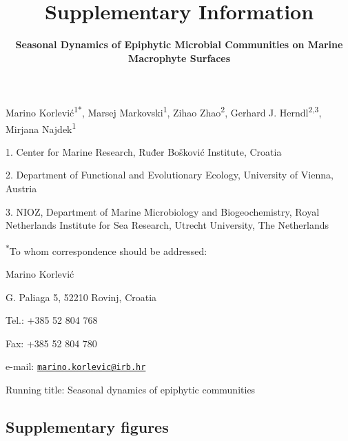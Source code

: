 \documentclass[12pt,]{article}
\title{\textbf{Supplementary Information}}
\subtitle{\textbf{Seasonal Dynamics of Epiphytic Microbial Communities on Marine
Macrophyte Surfaces}}
\author{}
\date{}
\begin{document}
\maketitle

\vspace{20mm}

Marino Korlević\textsuperscript{1\(*\)}, Marsej
Markovski\textsuperscript{1}, Zihao Zhao\textsuperscript{2}, Gerhard J.
Herndl\textsuperscript{2,3}, Mirjana Najdek\textsuperscript{1}

1. Center for Marine Research, Ruđer Bošković Institute, Croatia

2. Department of Functional and Evolutionary Ecology, University of
Vienna, Austria

3. NIOZ, Department of Marine Microbiology and Biogeochemistry, Royal
Netherlands Institute for Sea Research, Utrecht University, The
Netherlands

\textsuperscript{\(*\)}To whom correspondence should be addressed:

Marino Korlević

G. Paliaga 5, 52210 Rovinj, Croatia

Tel.: +385 52 804 768

Fax: +385 52 804 780

e-mail:
\href{mailto:marino.korlevic@irb.hr}{\nolinkurl{marino.korlevic@irb.hr}}

Running title: Seasonal dynamics of epiphytic communities

\linenumbers
{}
\setlength\parindent{24pt}

\hypertarget{supplementary-figures}{%
\subsection{Supplementary figures}\label{supplementary-figures}}
\end{document}
